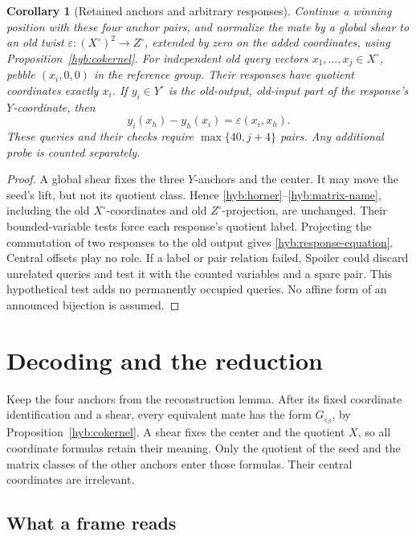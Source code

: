 \documentclass[11pt]{article}
\newcommand{\eps}{\varepsilon}
\newtheorem{corollary}[theorem]{Corollary}
\theoremstyle{definition}
\theoremstyle{remark}
\numberwithin{equation}{section}
\begin{document}
\begin{corollary}[Retained anchors and arbitrary responses]
\label{hyb:responses}
Continue a winning position with these four anchor pairs, and normalize
the mate by a global shear to an old twist
\(\varepsilon:(X^\circ)^2\to Z^\circ\), extended by zero on the
added coordinates, using Proposition~\ref{hyb:cokernel}.
For independent old query vectors \(x_1,\ldots,x_j\in X^\circ\), pebble
\((x_i,0,0)\) in the reference group.  Their responses have quotient
coordinates exactly \(x_i\).  If \(y_i\in Y^\circ\) is the old-output,
old-input part of the response's \(Y\)-coordinate, then
\begin{equation}
 y_i(x_h)-y_h(x_i)=\varepsilon(x_i,x_h).
 \label{hyb:response-equation}
\end{equation}
These queries and their checks require
\(\max\{40,j+4\}\) pairs. Any additional probe is counted separately.
\end{corollary}
\begin{proof}
A global shear fixes the three \(Y\)-anchors and the
center.  It may move the seed's lift, but not its quotient class.
Hence \eqref{hyb:horner}--\eqref{hyb:matrix-name}, including the old
\(X^\circ\)-coordinates and old \(Z^\circ\)-projection, are unchanged.
Their bounded-variable tests force each response's quotient label.
Projecting the commutation of two responses to the old output gives
\eqref{hyb:response-equation}. Central offsets play no role.
If a label or pair relation failed, Spoiler could discard unrelated
queries and test it with the counted variables and a spare pair.
This hypothetical test adds no permanently occupied queries.
No affine form of an announced bijection is assumed.
\end{proof}

\section{Decoding and the reduction}
\label{sec:reduction}

Keep the four anchors from the reconstruction lemma.
After its fixed coordinate identification and a shear, every equivalent
mate has the form $G_{\eps_\beta}$, by
Proposition~\ref{hyb:cokernel}. A shear fixes the center and the
quotient $X$, so all coordinate formulas retain their meaning.
Only the quotient of the seed and the matrix classes of the other
anchors enter those formulas. Their central coordinates are irrelevant.

\subsection{What a frame reads}
\end{document}
